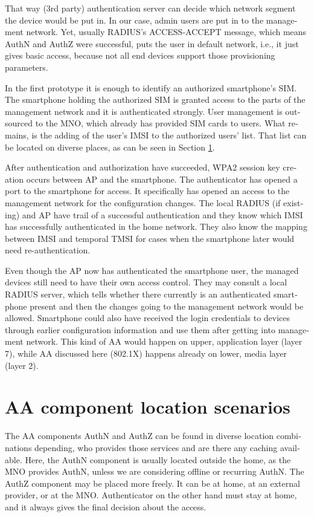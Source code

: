 \documentclass[12pt,a4paper,english]{tutthesis}
\begin{document}
\begin{otherlanguage}{english}
That way (3rd party) authentication server can decide which network
segment the device would be put in.  In our case, admin users are put in
to the management network.  Yet, usually RADIUS's ACCESS-ACCEPT message,
which means AuthN and AuthZ were successful,  puts the user in
default network, i.e., it just gives basic access, because 
not all end devices support those provisioning parameters.

In the first prototype it is enough to identify an authorized
smartphone's SIM.  The smartphone holding the authorized SIM is granted access to
the parts of the management network and it is authenticated strongly.  User
management is outsourced to the MNO, which
already has provided SIM cards to users. What remains, is the adding
of the user's IMSI to the authorized users' list. That list can be
located on diverse places, as can be seen in Section \ref{sec-4-2}.


After authentication and authorization have succeeded, WPA2 session key
creation occurs between AP and the smartphone. 
The authenticator has opened a port to the smartphone for
access. It specifically has opened an access to the management network for
the configuration changes. 
The local RADIUS (if existing) and AP have trail of a successful
authentication and they know which IMSI has successfully authenticated in
the home network. They also know the mapping between IMSI and temporal TMSI for
cases when the smartphone later would need re-authentication.


Even though the AP now has authenticated the smartphone user, the managed devices still 
need to have their own access control.
They may consult a local RADIUS server, which tells whether there currently is an
authenticated smartphone present and then the changes going
to the management network would be allowed. Smartphone could also have
received the login credentials to devices through earlier 
configuration information and use them after getting into management
network. This kind of AA would happen on upper, application layer
(layer 7), while AA discussed here (802.1X) happens already on lower, media layer (layer 2).

\section{AA component location scenarios}
\label{sec-4-2}


The AA components AuthN and AuthZ can be found in diverse location
combinations
depending, who provides those services and are there any caching
available. 
Here, the AuthN component 
is usually located outside the home, as the MNO provides AuthN, unless
we are considering offline or recurring AuthN.
The AuthZ component may be placed more freely. It can be at
home, at an external provider, or at the MNO.
Authenticator on the other hand must stay at home, and it always 
gives the final decision about the access.


\end{otherlanguage}
\end{document}
